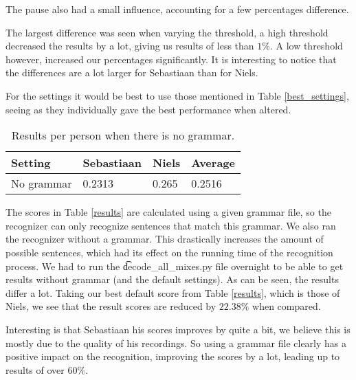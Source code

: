The pause also had a small influence, accounting for a few percentages difference.

The largest difference was seen when varying the threshold, a high threshold decreased the results by a lot, giving us results of less than $1\%$. A low threshold however, increased our percentages significantly. It is interesting to notice that the differences are a lot larger for Sebastiaan than for Niels. 

For the settings it would be best to use those mentioned in Table \ref{best_settings}, seeing as they individually gave the best performance when altered.

\begin{table}[]
\centering
\begin{tabular}{l|lll}
Setting          & Sebastiaan & Niels  & Average \\ \hline
No grammar       & 0.2313     & 0.265  & 0.2516  \\ 
\end{tabular}
\caption{Results per person when there is no grammar.}
\label{no_grammar}
\end{table}

The scores in Table \ref{results} are calculated using a given grammar file, so the recognizer can only recognize sentences that match this grammar. We also ran the recognizer without a grammar. This drastically increases the amount of possible sentences, which had its effect on the running time of the recognition process. We had to run the \t{decode_all_mixes.py} file overnight to be able to get results without grammar (and the default settings). As can be seen, the results differ a lot. Taking our best default score from Table \ref{results}, which is those of Niels, we see that the result scores are reduced by $22.38\%$ when compared. 

Interesting is that Sebastiaan his scores improves by quite a bit, we believe this is mostly due to the quality of his recordings. So using a grammar file clearly has a positive impact on the recognition, improving the scores by a lot, leading up to results of over $60\%$.
